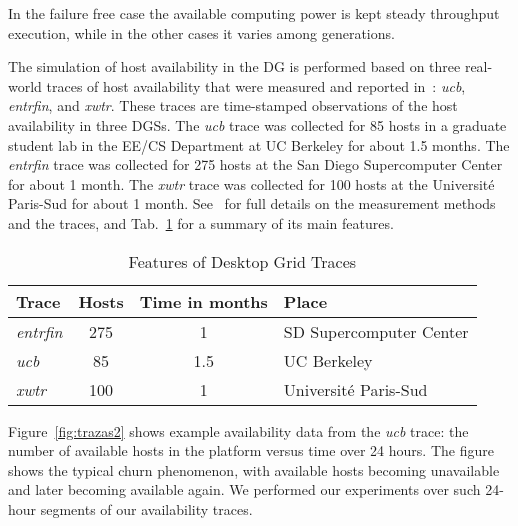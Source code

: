 \documentclass[graybox]{sty/svmult}
\begin{document}
In the failure free case the available computing power is kept steady throughput execution, while in the other cases it
varies among generations.

The simulation of host availability in the DG is performed based
on three real-world traces of host availability that were measured
and reported in~\cite{traces-dgc}: \emph{ucb}, \emph{entrfin}, and
\emph{xwtr}. These traces are time-stamped observations of the host
availability in three DGSs.  The \emph{ucb} trace was collected for 85
hosts in a graduate student lab in the EE/CS Department at UC Berkeley
for about 1.5 months. The \emph{entrfin} trace was collected for 275 hosts
at the San Diego Supercomputer Center for about 1 month. The \emph{xwtr}
trace was collected for 100 hosts at the Universit\'e Paris-Sud for
about 1 month. See~\cite{traces-dgc} for full details on the measurement
methods and the traces, and Tab.~\ref{tab:traces-summary} for a summary of its main features.

\begin{table}[h]
    \center
    \caption{\label{tab:traces-summary}Features of Desktop Grid Traces}
    \begin{tabular}{|l|c|c|l|}
        \hline
        Trace & Hosts & Time in months & Place\\
        \hline
        \emph{entrfin} & 275 & 1 & SD Supercomputer Center \\
        \hline
        \emph{ucb} & 85 & 1.5  & UC Berkeley\\
        \hline
        \emph{xwtr} & 100 & 1 & Universit\'e Paris-Sud\\
        \hline
    \end{tabular}
\end{table}

Figure~\ref{fig:trazas2} shows example availability data from the \emph{ucb}
trace: the number of available hosts in the platform versus time over 24
hours. The figure shows the typical churn phenomenon, with available hosts
becoming unavailable and later becoming available again.  We performed
our experiments over such 24-hour segments of our availability traces.
\end{document}
